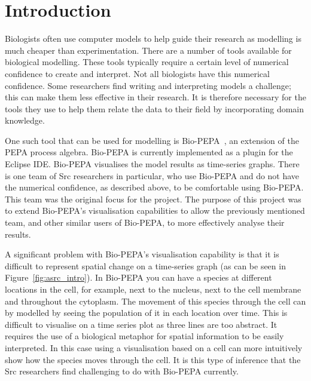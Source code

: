 \chapter{Introduction}

Biologists often use computer models to help guide their research as modelling is much cheaper than experimentation.  There are a number of tools available for biological modelling.  These tools typically require a certain level of numerical confidence to create and interpret.  Not all biologists have this numerical confidence.  Some researchers find writing and interpreting models a challenge; this can make them less effective in their research.  It is therefore necessary for the tools they use to help them relate the data to their field by incorporating domain knowledge.

One such tool that can be used for modelling is Bio-PEPA~\cite{biopepa}, an extension of the PEPA process algebra.  Bio-PEPA is currently implemented as a plugin for the Eclipse IDE.  Bio-PEPA visualises the model results as time-series graphs.  There is one team of Src researchers in particular, who use Bio-PEPA and do not have the numerical confidence, as described above, to be comfortable using Bio-PEPA.  This team was the original focus for the project.  The purpose of this project was to extend Bio-PEPA's visualisation capabilities to allow the previously mentioned team, and other similar users of Bio-PEPA, to more effectively analyse their results.

A significant problem with Bio-PEPA's visualisation capability is that it is difficult to represent spatial change on a time-series graph (as can be seen in Figure~\ref{fig:asrc_intro}).  In Bio-PEPA you can have a species at different locations in the cell, for example, next to the nucleus, next to the cell membrane and throughout the cytoplasm.  The movement of this species through the cell can by modelled by seeing the population of it in each location over time.  This is difficult to visualise on a time series plot as three lines are too abstract.  It requires the use of a biological metaphor for spatial information to be easily interpreted.  In this case using a visualisation based on a cell can more intuitively show how the species moves through the cell.  It is this type of inference that the Src researchers find challenging to do with Bio-PEPA currently.

